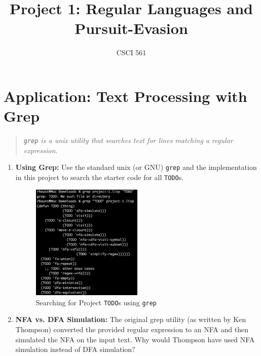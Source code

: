 \documentclass[12pt,letterpaper]{ntdhw}
\title{Project 1: Regular Languages and Pursuit-Evasion}
\author{CSCI 561}
\begin{document}
\pagestyle{fancyplain}

\maketitle
\thispagestyle{fancyplain}



\section*{Application: Text Processing with Grep}

\begin{quote}
  \emph{\texttt{grep} is a unix utility that searches text for lines
    matching a regular expression.}
\end{quote}

\begin{enumerate}
  \item \textbf{Using Grep:} Use the standard unix (or GNU)
  \texttt{grep} and the implementation in this project to search the
  starter code for all \texttt{TODO}s.

  \begin{figure}[h!]
    \centering
    \includegraphics[width=0.5\textwidth]{grepScreenCap.png} %
    \caption{Searching for Project \texttt{TODO}s using \texttt{grep}}
    \label{fig:grep-usage}
  \end{figure}

  \item \textbf{NFA vs. DFA Simulation:} The original grep utility (as
  written by Ken Thompson) converted the provided regular expression
  to an NFA and then simulated the NFA on the input text.  Why would
  Thompson have used NFA simulation instead of DFA simulation?


\end{enumerate}
\end{document}
